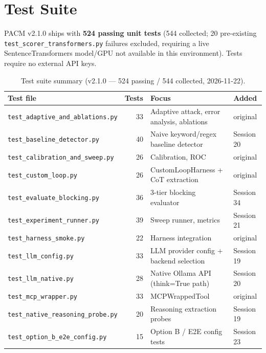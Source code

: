 \documentclass[11pt,letterpaper]{article}
\newcommand{\pacm}{\textsc{PACM}}
\begin{document}
\section{Test Suite}
\label{app:tests}

\pacm{} v2.1.0 ships with \textbf{524 passing unit tests} (544 collected;
20 pre-existing \texttt{test\_scorer\_transformers.py} failures excluded,
requiring a live SentenceTransformers model/GPU not available in this
environment). Tests require no external API keys.

\begin{table}[htbp]
\centering
\caption{Test suite summary (v2.1.0 --- 524 passing / 544 collected, 2026-11-22).}
\label{tab:tests}
\begin{tabular}{lrll}
\toprule
Test file & Tests & Focus & Added \\
\midrule
\texttt{test\_adaptive\_and\_ablations.py}  & 33 & Adaptive attack, error analysis, ablations & original \\
\texttt{test\_baseline\_detector.py}        & 40 & Naive keyword/regex baseline detector       & Session 20 \\
\texttt{test\_calibration\_and\_sweep.py}   & 26 & Calibration, ROC                            & original \\
\texttt{test\_custom\_loop.py}              & 26 & CustomLoopHarness + CoT extraction          & original \\
\texttt{test\_evaluate\_blocking.py}        & 36 & 3-tier blocking evaluator                   & Session 34 \\
\texttt{test\_experiment\_runner.py}        & 39 & Sweep runner, metrics                       & Session 21 \\
\texttt{test\_harness\_smoke.py}            & 22 & Harness integration                         & original \\
\texttt{test\_llm\_config.py}              & 33 & LLM provider config + backend selection     & Session 19 \\
\texttt{test\_llm\_native.py}              & 28 & Native Ollama API (think=True path)         & Session 20 \\
\texttt{test\_mcp\_wrapper.py}              & 33 & MCPWrappedTool                              & original \\
\texttt{test\_native\_reasoning\_probe.py}  & 20 & Reasoning extraction probes                 & Session 19 \\
\texttt{test\_option\_b\_e2e\_config.py}    & 15 & Option B / E2E config tests                 & Session 23 \\

\end{tabular}
\end{table}
\end{document}
